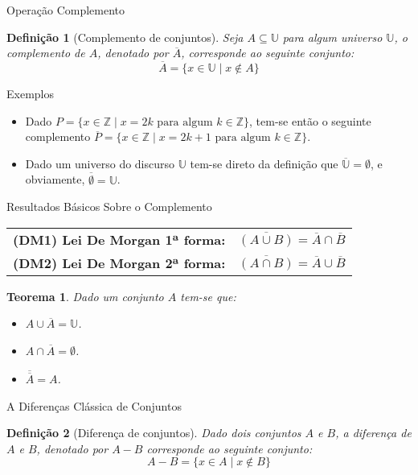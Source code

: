 \documentclass[aspectratio=169]{beamer}
\newtheorem{defi}{Definição}
\newtheorem{teo}{Teorema}
\begin{document}
	\begin{frame}{Operação Complemento}
		\begin{defi}[Complemento de conjuntos]\label{def:ComplementoConjuntos}
			Seja $A \subseteq \mathbb{U}$ para algum universo $\mathbb{U}$, o complemento de $A$, denotado por $\overline{A}$, corresponde ao seguinte conjunto:
			$$\overline{A} = \{x \in \mathbb{U} \mid x \notin A\}$$
		\end{defi}
	\end{frame}

	\begin{frame}{Exemplos}
		\begin{itemize}
			\item Dado $P = \{ x \in \mathbb{Z} \mid x = 2k \mbox{ para algum } k \in \mathbb{Z}\}$, tem-se então o seguinte complemento $\overline{P} = \{ x \in \mathbb{Z} \mid x = 2k + 1 \mbox{ para algum } k \in \mathbb{Z}\}$.
			\item Dado um universo do discurso $\mathbb{U}$ tem-se direto da definição que $\overline{\mathbb{U}} = \emptyset$, e obviamente, $\overline{\emptyset} = \mathbb{U}$.
		\end{itemize}
	\end{frame}

	\begin{frame}{Resultados Básicos Sobre o Complemento}
		\begin{tabular}{lc}
			\textbf{(DM1) Lei De Morgan 1ª forma:} & $\overline{(A \cup B)} = \overline{A} \cap \overline{B}$\\
			\textbf{(DM2) Lei De Morgan 2ª forma:} & $\overline{(A \cap B)} = \overline{A} \cup \overline{B}$\\
		\end{tabular}
		\pause
		\begin{teo}
			Dado um conjunto $A$ tem-se que:
			\begin{itemize}
				\item[i.] $A \cup \overline{A} = \mathbb{U}$.
				\item[ii.] $A \cap \overline{A} = \emptyset$.
				\item[iii.] $\overline{\overline{A}} = A$.
			\end{itemize}
		\end{teo}
	\end{frame}

	\begin{frame}{A Diferenças Clássica de Conjuntos}
		\begin{defi}[Diferença de conjuntos]\label{def:DiferencaConjuntos}
			Dado dois conjuntos $A$ e $B$, a diferença de $A$ e $B$, denotado por $A - B$ corresponde ao seguinte conjunto:
			$$A - B = \{x \in A \mid x \notin B\}$$
		\end{defi}
	\end{frame}
\end{document}
